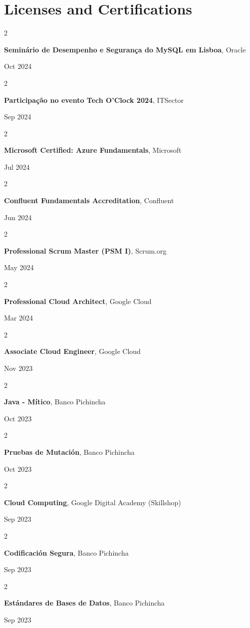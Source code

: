 \documentclass[10pt, letterpaper]{article}
\newenvironment{twocolentry}[2][]{
    \onecolentry
    \def\secondColumn{#2}
    \setcolumnwidth{\fill, 4.5 cm}
    \begin{paracol}{2}
}{
    \switchcolumn \raggedleft \secondColumn
    \end{paracol}
    \endonecolentry
} %
\begin{document}
    \section{Licenses and Certifications}
        \begin{twocolentry}{
        Oct 2024
    }
    \textbf{Seminário de Desempenho e Segurança do MySQL em Lisboa}, Oracle
    \end{twocolentry}
    \begin{twocolentry}{
        Sep 2024
    }
    \textbf{Participação no evento Tech O'Clock 2024}, ITSector
    \end{twocolentry}
    \begin{twocolentry}{
        Jul 2024
    }
    \textbf{Microsoft Certified: Azure Fundamentals}, Microsoft
    \end{twocolentry}
    \begin{twocolentry}{
            Jun 2024
        }
        \textbf{Confluent Fundamentals Accreditation}, Confluent
    \end{twocolentry}
    \begin{twocolentry}{
            May 2024
        }
        \textbf{Professional Scrum Master (PSM I)}, Scrum.org
    \end{twocolentry}
    \begin{twocolentry}{
            Mar 2024
        }
        \textbf{Professional Cloud Architect}, Google Cloud
    \end{twocolentry}
    \begin{twocolentry}{
            Nov 2023
        }
        \textbf{Associate Cloud Engineer}, Google Cloud
    \end{twocolentry}
    \begin{twocolentry}{
            Oct 2023
        }
        \textbf{Java - Mítico}, Banco Pichincha
    \end{twocolentry}
    \begin{twocolentry}{
            Oct 2023
        }
        \textbf{Pruebas de Mutación}, Banco Pichincha
    \end{twocolentry}
    \begin{twocolentry}{
            Sep 2023
        }
        \textbf{Cloud Computing}, Google Digital Academy (Skillshop)
    \end{twocolentry}
    \begin{twocolentry}{
            Sep 2023
        }
        \textbf{Codificación Segura}, Banco Pichincha
    \end{twocolentry}
    \begin{twocolentry}{
            Sep 2023
        }
        \textbf{Estándares de Bases de Datos}, Banco Pichincha
    \end{twocolentry}
\end{document}
